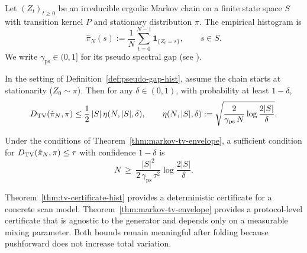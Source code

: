 \begin{definition}\label{def:pseudo-gap-hist}
Let $(Z_t)_{t\ge 0}$ be an irreducible ergodic Markov chain on a finite state space $S$ with transition kernel $P$ and stationary distribution $\pi$.
The empirical histogram is
\[
\hat{\pi}_N(s):=\frac{1}{N}\sum_{t=0}^{N-1}\mathbf{1}_{\{Z_t=s\}},\qquad s\in S.
\]
We write $\gamma_{\mathrm{ps}}\in(0,1]$ for its pseudo spectral gap (see \cite{Paulin2015MarkovConcentration}).
\end{definition}

\begin{theorem}\label{thm:markov-tv-envelope}
In the setting of Definition~\ref{def:pseudo-gap-hist}, assume the chain starts at stationarity ($Z_0\sim\pi$).
Then for any $\delta\in(0,1)$, with probability at least $1-\delta$,
\[
D_{\mathrm{TV}}(\hat{\pi}_N,\pi)\le \frac12\,|S|\,\eta(N,|S|,\delta),
\qquad
\eta(N,|S|,\delta):=\sqrt{\frac{2}{\gamma_{\mathrm{ps}}\,N}\log\frac{2|S|}{\delta}}.
\]
\end{theorem}

\begin{corollary}\label{cor:markov-tv-sample-complexity}
Under the conditions of Theorem~\ref{thm:markov-tv-envelope}, a sufficient condition for
$
D_{\mathrm{TV}}(\hat{\pi}_N,\pi)\le \tau
$
with confidence $1-\delta$ is
\[
N\ \ge\ \frac{|S|^{2}}{2\,\gamma_{\mathrm{ps}}\,\tau^{2}}\log\frac{2|S|}{\delta}.
\]
\end{corollary}

\begin{remark}\label{rem:cert-why-folding}
Theorem~\ref{thm:tv-certificate-hist} provides a deterministic certificate for a concrete scan model.
Theorem~\ref{thm:markov-tv-envelope} provides a protocol-level certificate that is agnostic to the generator and depends only on a measurable mixing parameter.
Both bounds remain meaningful after folding because pushforward does not increase total variation.
\end{remark}

